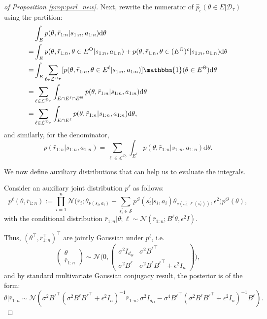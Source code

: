 \documentclass{amsart}
\begin{document}
\begin{proof}[of Proposition \ref{prop:psrl_new}]
Next, rewrite the numerator of $\hat{p}_\epsilon(\theta \in E|\mathcal{D}_\tau)$ using the partition:
\begin{align*}
   &  \int_{E} p(\theta,\bar{r}_{1:n}|s_{1:n},a_{1:n})\mathrm{d} \theta \\
    =& \int_{E} p(\theta,\bar{r}_{1:n}, \theta \in E^\Theta|s_{1:n},a_{1:n}) + p(\theta,\bar{r}_{1:n}, \theta \in (E^\Theta)^c|s_{1:n},a_{1:n})\mathrm{d} \theta \\
    =& \int_{E} \sum_{\ell \in \mathcal{L}^{\mathcal{D}_\tau}} [p(\theta,\bar{r}_{1:n},\theta \in E^{\ell}|s_{1:n}, a_{1:n})]\mathbbm{1}(\theta \in E^\Theta) \mathrm{d}\theta \\
    =& \sum_{\ell \in \mathcal{L}^{\mathcal{D}_\tau}} \int_{E \cap E^\ell \cap E^\Theta} p(\theta,\bar{r}_{1:n}|s_{1:n},a_{1:n}) \mathrm{d} \theta \\
    =& \sum_{\ell \in \mathcal{L}^{\mathcal{D}_\tau}} \int_{E \cap E^\ell} p(\theta,\bar{r}_{1:n}|s_{1:n},a_{1:n}) \mathrm{d} \theta,
\end{align*}
and similarly, for the denominator,
\begin{equation*}
   p(\bar{r}_{1:n}|s_{1:n},a_{1:n})   = \sum_{\ell \in \mathcal{L}^{\mathcal{D}_\tau}} \int_{E^\ell} p(\theta,\bar{r}_{1:n}|s_{1:n},a_{1:n}) \mathrm{d} \theta.
\end{equation*}

We now define auxiliary distributions that can help us to evaluate the integrals. 

Consider an auxiliary joint distribution $p^{\ell}$ as follows:
$$p^{\ell}(\theta,\bar{r}_{1:n}) := \prod_{i=1}^n \mathcal{N} \Big(\bar{r}_i;\theta_{\nu(s_i,a_i)} - 
\sum_{s_i^\prime \in \mathcal{S}} p^S(s_i^\prime|s_i,a_i) \theta_{\nu(s_i^\prime,\ell(s_i^\prime))},\epsilon^2 \Big) p^\Theta(\theta),$$
with the conditional distribution $\bar{r}_{1:n}|\theta;\ell \sim \mathcal{N}(\bar{r}_{1:n}; B^\ell \theta, \epsilon^2 I)$.

Thus, $(\theta^\top,\bar{r}_{1:n}^\top)^\top$ are jointly Gaussian under $p^\ell$, i.e.
\begin{equation}
\begin{pmatrix} \theta \\ \bar{r}_{1:n} \end{pmatrix} \sim \mathcal{N}\Bigg(0, \begin{pmatrix} \sigma^2I_{d_{\Theta}} & \sigma^2{B^{\ell}}^\top \\ \sigma^2 B^\ell & \sigma^2 B^\ell {B^\ell}^\top + \epsilon^2I_n\end{pmatrix}\Bigg),
\label{eqn:jointgaussian:apdproofpsrl}
\end{equation}
and by standard multivariate Gaussian conjugacy result, the posterior is of the form:
$$\theta|\bar{r}_{1:n} \sim \mathcal{N}(\sigma^2 {B^\ell}^\top(\sigma^2 B^\ell {B^\ell}^\top + \epsilon^2 I_n)^{-1} \bar{r}_{1:n}, \sigma^2 I_{d_{\Theta}} - \sigma^4 {B^\ell}^\top(\sigma^2 B^\ell {B^\ell}^\top + \epsilon^2 I_n)^{-1} B^\ell).$$


\end{proof}
\end{document}
